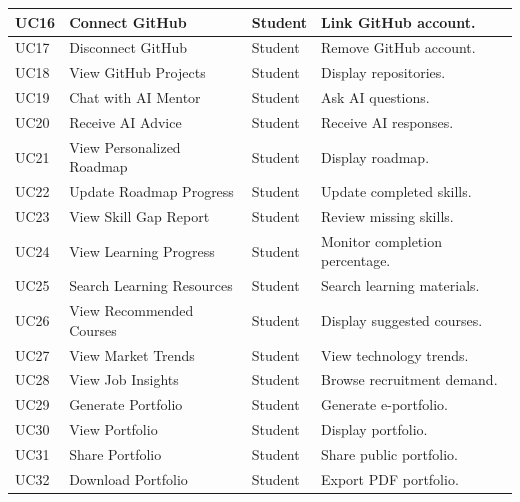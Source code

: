 \begin{longtable}{|>{\centering\arraybackslash}p{1cm}|p{4cm}|p{3.3cm}|p{7.2cm}|}
UC16 &
Connect GitHub &
Student &
Link GitHub account.
\\
\hline

UC17 &
Disconnect GitHub &
Student &
Remove GitHub account.
\\
\hline

UC18 &
View GitHub Projects &
Student &
Display repositories.
\\
\hline

UC19 &
Chat with AI Mentor &
Student &
Ask AI questions.
\\
\hline

UC20 &
Receive AI Advice &
Student &
Receive AI responses.
\\
\hline

UC21 &
View Personalized Roadmap &
Student &
Display roadmap.
\\
\hline

UC22 &
Update Roadmap Progress &
Student &
Update completed skills.
\\
\hline

UC23 &
View Skill Gap Report &
Student &
Review missing skills.
\\
\hline

UC24 &
View Learning Progress &
Student &
Monitor completion percentage.
\\
\hline

UC25 &
Search Learning Resources &
Student &
Search learning materials.
\\
\hline

UC26 &
View Recommended Courses &
Student &
Display suggested courses.
\\
\hline

UC27 &
View Market Trends &
Student &
View technology trends.
\\
\hline

UC28 &
View Job Insights &
Student &
Browse recruitment demand.
\\
\hline

UC29 &
Generate Portfolio &
Student &
Generate e-portfolio.
\\
\hline

UC30 &
View Portfolio &
Student &
Display portfolio.
\\
\hline

UC31 &
Share Portfolio &
Student &
Share public portfolio.
\\
\hline

UC32 &
Download Portfolio &
Student &
Export PDF portfolio.
\\
\hline


\end{longtable}
